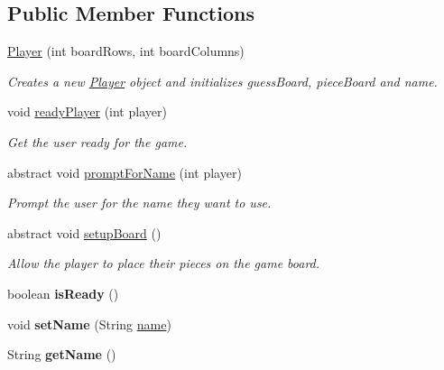 \subsection*{Public Member Functions}
\begin{DoxyCompactItemize}
\item 
\hyperlink{classbattleShip_1_1Player_a84d74412700d272b08418669be84f917}{Player} (int board\-Rows, int board\-Columns)
\begin{DoxyCompactList}\small\item\em Creates a new \hyperlink{classbattleShip_1_1Player}{Player} object and initializes guess\-Board, piece\-Board and name. \end{DoxyCompactList}\item 
void \hyperlink{classbattleShip_1_1Player_a777f39da73ac37362d259ba840e88fb2}{ready\-Player} (int player)
\begin{DoxyCompactList}\small\item\em Get the user ready for the game. \end{DoxyCompactList}\item 
abstract void \hyperlink{classbattleShip_1_1Player_a7d2073f6e08c56c500b1abac95345105}{prompt\-For\-Name} (int player)
\begin{DoxyCompactList}\small\item\em Prompt the user for the name they want to use. \end{DoxyCompactList}\item 
\hypertarget{classbattleShip_1_1Player_acb9e756832ce9afef891658d83c48713}{abstract void \hyperlink{classbattleShip_1_1Player_acb9e756832ce9afef891658d83c48713}{setup\-Board} ()}\label{classbattleShip_1_1Player_acb9e756832ce9afef891658d83c48713}

\begin{DoxyCompactList}\small\item\em Allow the player to place their pieces on the game board. \end{DoxyCompactList}\item 
\hypertarget{classbattleShip_1_1Player_a716a672218a3e61e143860c9e18947de}{boolean {\bfseries is\-Ready} ()}\label{classbattleShip_1_1Player_a716a672218a3e61e143860c9e18947de}

\item 
\hypertarget{classbattleShip_1_1Player_a85f80769be58bde359baf98eff289efe}{void {\bfseries set\-Name} (String \hyperlink{classbattleShip_1_1Player_a0be29098278ff1ccb8ebac1fc08546c2}{name})}\label{classbattleShip_1_1Player_a85f80769be58bde359baf98eff289efe}

\item 
\hypertarget{classbattleShip_1_1Player_a36a5c5c7485d2c05d36dccb19165fb84}{String {\bfseries get\-Name} ()}\label{classbattleShip_1_1Player_a36a5c5c7485d2c05d36dccb19165fb84}

\end{DoxyCompactItemize}
